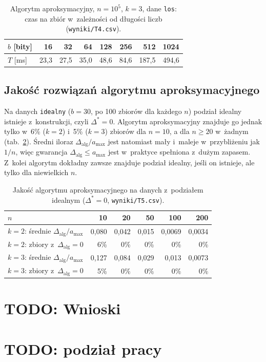 \documentclass[11pt]{article}
\begin{document}
\begin{table}[htbp]
    \centering
    \begin{tabular}{lrrrrrrr}
        \toprule
        \(b\) [bity] & 16 & 32 & 64 & 128 & 256 & 512 & 1024 \\
        \midrule
        \(T\) [ms] & 23,3 & 27,5 & 35,0 & 48,6 & 84,6 & 187,5 & 494,6 \\
        \bottomrule
    \end{tabular}
    \caption{Algorytm aproksymacyjny, \(n=10^5\), \(k=3\), dane \texttt{los}: czas na zbiór
             w~zależności od długości liczb (\texttt{wyniki/T4.csv}).}
    \label{tab:t4}
\end{table}

\subsection{Jakość rozwiązań algorytmu aproksymacyjnego}

Na danych \texttt{idealny} (\(b=30\), po 100 zbiorów dla każdego \(n\)) podział idealny
istnieje z~konstrukcji, czyli \(\Delta^*=0\). Algorytm aproksymacyjny znajduje go jednak
tylko w~6\% (\(k=2\)) i~5\% (\(k=3\)) zbiorów dla \(n=10\), a dla \(n\geq20\) w~żadnym
(tab.~\ref{tab:t5}). Średni iloraz \(\Delta_{\mathrm{alg}}/a_{\max}\) jest natomiast mały
i~maleje w~przybliżeniu jak \(1/n\), więc gwarancja \(\Delta_{\mathrm{alg}}\leq a_{\max}\)
jest w~praktyce spełniona z~dużym zapasem. Z~kolei algorytm dokładny zawsze znajduje
podział idealny, jeśli on istnieje, ale tylko dla niewielkich \(n\).

\begin{table}[htbp]
    \centering
    \begin{tabular}{lrrrrr}
        \toprule
        \(n\) & 10 & 20 & 50 & 100 & 200 \\
        \midrule
        \(k=2\): średnie \(\Delta_{\mathrm{alg}}/a_{\max}\) & 0,080 & 0,042 & 0,015 & 0,0069 & 0,0034 \\
        \(k=2\): zbiory z~\(\Delta_{\mathrm{alg}}=0\) & 6\% & 0\% & 0\% & 0\% & 0\% \\
        \(k=3\): średnie \(\Delta_{\mathrm{alg}}/a_{\max}\) & 0,127 & 0,084 & 0,029 & 0,013 & 0,0073 \\
        \(k=3\): zbiory z~\(\Delta_{\mathrm{alg}}=0\) & 5\% & 0\% & 0\% & 0\% & 0\% \\
        \bottomrule
    \end{tabular}
    \caption{Jakość algorytmu aproksymacyjnego na danych z~podziałem idealnym
             (\(\Delta^*=0\), \texttt{wyniki/T5.csv}).}
    \label{tab:t5}
\end{table}


\section{TODO: Wnioski}

\section{TODO: podział pracy}
\end{document}
